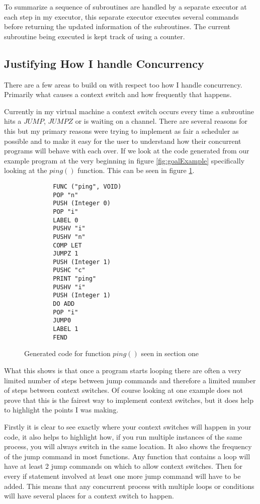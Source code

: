 To summarize a sequence of subroutines are handled by a separate executor at each step in my executor, this separate executor executes several commands before returning the updated information of the subroutines. The current subroutine being executed is kept track of using a counter. 


\subsection{Justifying How I handle Concurrency}

There are a few areas to build on with respect too how I handle concurrency. Primarily what causes a context switch and how frequently that happens. 

Currently in my virtual machine a context switch occurs every time a subroutine hits a $JUMP$, $JUMPZ$ or is waiting on a channel. There are several reasons for this but my primary reasons were trying to implement as fair a scheduler as possible and to make it easy for the user to understand how their concurrent programs will behave with each over. If we look at the code generated from our example program at the very beginning in figure \ref{fig:goalExample} specifically looking at the $ping()$ function. This can be seen in figure \ref{fig:pingCode}.

\begin{figure}[h]
\centering
\begin{lstlisting}
		FUNC ("ping", VOID)
		POP "n"
		PUSH (Integer 0)
		POP "i"
		LABEL 0
		PUSHV "i"
		PUSHV "n"
		COMP LET
		JUMPZ 1
		PUSH (Integer 1)
		PUSHC "c"
		PRINT "ping"
		PUSHV "i"
		PUSH (Integer 1)
		DO ADD
		POP "i"
		JUMP0
		LABEL 1
		FEND
\end{lstlisting}
\caption{Generated code for function $ping()$ seen in section one}
\label{fig:pingCode}
\end{figure}


What this shows is that once a program starts looping there are often a very limited number of steps between jump commands and therefore a limited number of steps between context switches. Of course looking at one example does not prove that this is the fairest way to implement context switches, but it does help to highlight the points I was making.

Firstly it is clear to see exactly where your context switches will happen in your code, it also helps to highlight how, if you run multiple instances of the same process, you will always switch in the same location. It also shows the frequency of the jump command in most functions. Any function that contains a loop will have at least 2 jump commands on which to allow context switches. Then for every if statement involved at least one more jump command will have to be added. This means that any concurrent process with multiple loops or conditions will have several places for a context switch to happen.

